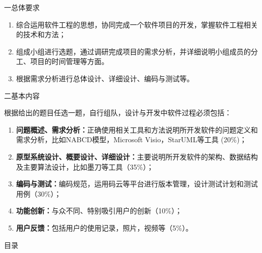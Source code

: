 \documentclass[12pt,a4paper]{ctexart}
\begin{document}
{\heiti 一\quad 总体要求}

\begin{enumerate}[label=(\arabic*)]
\item 综合运用软件工程的思想，协同完成一个软件项目的开发，掌握软件工程相关的技术和方法；
\item 组成小组进行选题，通过调研完成项目的需求分析，并详细说明小组成员的分工、项目的时间管理等方面。
\item 根据需求分析进行总体设计、详细设计、编码与测试等。
\end{enumerate}

\vspace{0.5cm}

{\heiti 二\quad 基本内容}

根据给出的题目任选一题，自行组队，设计与开发中软件过程必须包括：

\begin{enumerate}[label=\textbf{(\arabic*)}]
\item \textbf{问题概述、需求分析：}正确使用相关工具和方法说明所开发软件的问题定义和需求分析，比如NABCD模型，Microsoft Visio，StarUML等工具 (20\%)；
\item \textbf{原型系统设计、概要设计、详细设计：}主要说明所开发软件的架构、数据结构及主要算法设计，比如墨刀等工具（35\%）；
\item \textbf{编码与测试：}编码规范，运用码云等平台进行版本管理，设计测试计划和测试用例（30\%）；
\item \textbf{功能创新：}与众不同、特别吸引用户的创新（10\%）；
\item \textbf{用户反馈：}包括用户的使用记录，照片，视频等（5\%）。
\end{enumerate}

\newpage
{}
\setcounter{page}{1}

\begin{center}
{ \heiti 目\quad 录}
\end{center}

\vspace{0.5cm}

\begingroup
\makeatletter
\renewcommand{\tableofcontents}{}
\makeatother
\tableofcontents
\endgroup

\newpage
{}
\setcounter{page}{1}
\end{document}
